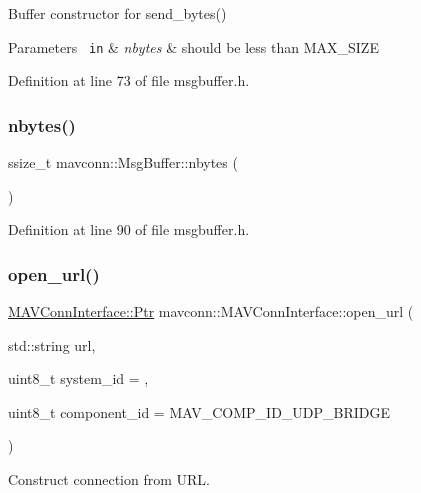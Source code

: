 Buffer constructor for send\+\_\+bytes() 


\begin{DoxyParams}[1]{Parameters}
\mbox{\texttt{ in}}  & {\em nbytes} & should be less than M\+A\+X\+\_\+\+S\+I\+ZE \\
\hline
\end{DoxyParams}


Definition at line 73 of file msgbuffer.\+h.

\mbox{\label{group__mavconn_ga564c27473f42c6cea687c8b5bbbb1621}} 
\subsubsection{\texorpdfstring{nbytes()}{nbytes()}}
{\footnotesize\ttfamily ssize\+\_\+t mavconn\+::\+Msg\+Buffer\+::nbytes (\begin{DoxyParamCaption}{ }\end{DoxyParamCaption})\hspace{0.3cm}{\ttfamily [inline]}}



Definition at line 90 of file msgbuffer.\+h.

\mbox{\label{group__mavconn_gad7b5a25103f1421a63839a1aa0f080dc}} 
\subsubsection{\texorpdfstring{open\_url()}{open\_url()}}
{\footnotesize\ttfamily \mbox{\hyperlink{group__mavconn_gaff41078b805e1d8f85ed6fd2d87711ce}{M\+A\+V\+Conn\+Interface\+::\+Ptr}} mavconn\+::\+M\+A\+V\+Conn\+Interface\+::open\+\_\+url (\begin{DoxyParamCaption}\item[{std\+::string}]{url,  }\item[{uint8\+\_\+t}]{system\+\_\+id = {},  }\item[{uint8\+\_\+t}]{component\+\_\+id = {\ttfamily MAV\+\_\+COMP\+\_\+ID\+\_\+UDP\+\_\+BRIDGE} }\end{DoxyParamCaption})\hspace{0.3cm}{\ttfamily [static]}}



Construct connection from U\+RL. 

